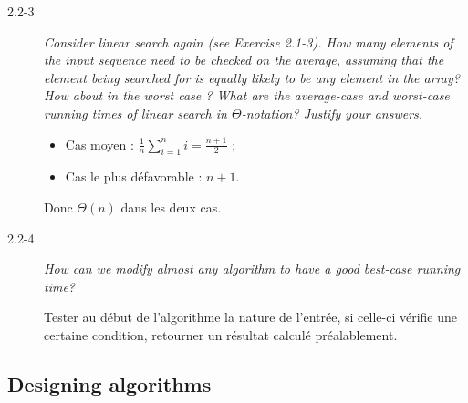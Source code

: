 \begin{description}
\begin{ex}
\begin{itemize}
    \end{itemize}

  \end{ex}

\item[2.2-3] {\itshape Consider linear search again (see Exercise 2.1-3). How many elements of the input sequence need to be checked on the average, assuming that the element being searched for is equally likely to be any element in the array? How about in the worst case ? What are the average-case and worst-case running times of linear search in $\Theta$-notation? Justify your answers.}

  \begin{ex}
    \begin{itemize}
      \item Cas moyen : $\frac{1}{n}\sum_{i=1}^ni = \frac{n+1}{2}$ ;
      \item Cas le plus d\'efavorable : $n+1$.
    \end{itemize}
    Donc $\Theta(n)$ dans les deux cas.
  \end{ex}

\item[2.2-4] {\itshape How can we modify almost any algorithm to have a good best-case running time?}

  \begin{ex}
    Tester au d\'ebut de l'algorithme la nature de l'entr\'ee, si celle-ci v\'erifie une certaine condition, retourner un r\'esultat calcul\'e pr\'ealablement. 
  \end{ex}

\end{description}

\subsection{Designing algorithms}

